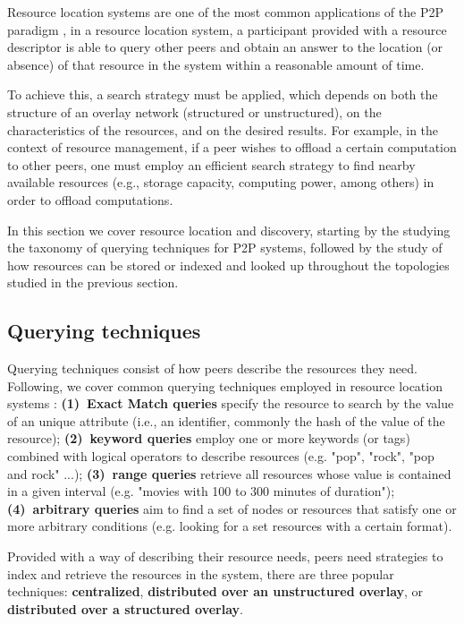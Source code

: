 

Resource location systems are one of the most common applications of the P2P paradigm \cite{leitaoPHDthesis}, in a resource location system, a participant provided with a resource descriptor is able to query other peers and obtain an answer to the location (or absence) of that resource in the system within a reasonable amount of time.

To achieve this, a search strategy must be applied, which depends on both the structure of an overlay network (structured or unstructured), on the characteristics of the resources, and on the desired results. For example, in the context of resource management, if a peer wishes to offload a certain computation to other peers, one must employ an efficient search strategy to find nearby available resources (e.g., storage capacity, computing power, among others) in order to offload computations.

In this section we cover resource location and discovery, starting by the studying the taxonomy of querying techniques for P2P systems, followed by the study of how resources can be stored or indexed and looked up throughout the topologies studied in the previous section.

\subsection{Querying techniques}

Querying techniques consist of how peers describe the resources they need. Following, we cover common querying techniques employed in resource location systems \cite{leitaoPHDthesis}: \textbf{(1)~Exact Match queries} specify the resource to search by the value of an unique attribute (i.e., an identifier, commonly the hash of the value of the resource); \textbf{(2)~keyword queries} employ one or more keywords (or tags) combined with logical operators to describe resources (e.g. "pop", "rock", "pop and rock" ...); \textbf{(3)~range queries} retrieve all resources whose value is contained in a given interval (e.g. "movies with 100 to 300 minutes of duration"); \textbf{(4)~arbitrary queries} aim to find a set of nodes or resources that satisfy one or more arbitrary conditions (e.g. looking for a set resources with a certain format).

Provided with a way of describing their resource needs, peers need strategies to index and retrieve the resources in the system, there are three popular techniques: \textbf{centralized}, \textbf{distributed over an unstructured overlay}, or \textbf{distributed over a structured overlay}.

